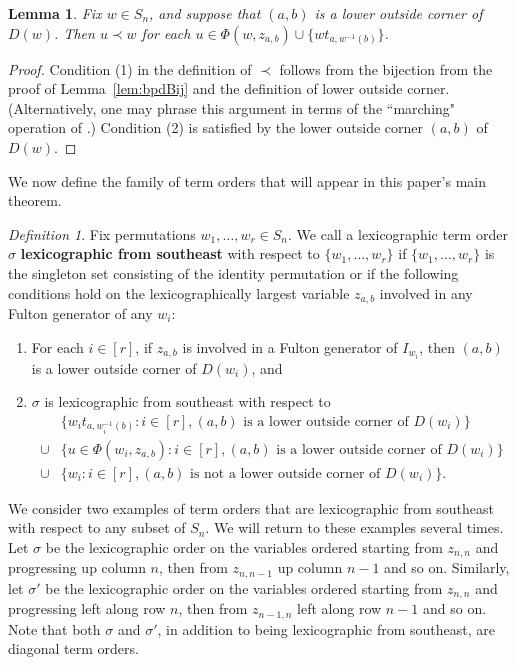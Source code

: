 \documentclass[12pt,reqno]{amsart}
\newtheorem{lemma}[theorem]{Lemma}
\newtheorem{Main Conjecture}[theorem]{Main Conjecture}
\theoremstyle{remark}
\newtheorem{defn}[theorem]{Definition}
\theoremstyle{plain}
\newcommand{\mydef}[1]{{\bf #1}}
\begin{document}
\begin{lemma}
\label{lem:indSmaller}
Fix $w \in S_n$, and suppose  that $(a,b)$ is a lower outside corner of $D(w)$. Then $u \prec w$ for each $u \in \Phi(w,z_{a,b}) \cup \{wt_{a,w^{-1}(b)}\}$.
\end{lemma}
\begin{proof}
Condition (1) in the definition of $\prec$ follows from the bijection from the proof of Lemma~\ref{lem:bpdBij} and the definition of lower outside corner. (Alternatively, one may phrase this argument in terms of the ``marching" operation of \cite{KY04}.) Condition (2) is satisfied by the lower outside corner $(a,b)$ of $D(w)$.\end{proof}




We now define the family of term orders that will appear in this paper's main theorem.  

\begin{defn}\label{def:lexFromSE}
Fix permutations $w_1, \ldots, w_r \in S_n$.  We call a lexicographic term order $\sigma$ \mydef{lexicographic from southeast} with respect to $\{w_1, \ldots, w_r\}$ if $\{w_1, \ldots, w_r\}$ is the singleton set consisting of the identity permutation or if the following conditions hold on the lexicographically largest variable $z_{a,b}$ involved in any Fulton generator of any $w_i$:
 \begin{enumerate}
    \item For each $i \in [r]$, if $z_{a,b}$ is involved in a Fulton generator of $I_{w_i}$, then $(a,b)$ is a lower outside corner of $D(w_i)$, and
    \item $\sigma$ is lexicographic from southeast with respect to \begin{align*}
   & \{w_i t_{a,w_i^{-1}(b)} : i \in [r], (a,b) \mbox{ is a lower outside corner of } D(w_i)\} \\
   \cup  &\{u \in \Phi(w_i,z_{a,b}) : i \in [r], (a,b) \mbox{ is a lower outside corner of } D(w_i)\} \\
   \cup &\{w_i : i \in [r], (a,b) \mbox{ is not a lower outside corner of } D(w_i)\}.
    \end{align*}
\end{enumerate}
\end{defn}

We consider two examples of term orders that are lexicographic from southeast with respect to any subset of $S_n$.  We will return to these examples several times. Let $\sigma$ be the lexicographic order on the variables ordered starting from $z_{n,n}$ and progressing up column $n$, then from $z_{n, n-1}$ up column $n-1$ and so on.  Similarly, let $\sigma'$ be the lexicographic order on the variables ordered starting from $z_{n,n}$ and progressing left along row $n$, then from $z_{n-1, n}$ left along row $n-1$ and so on.   Note that both $\sigma$ and $\sigma'$, in addition to being lexicographic from southeast, are diagonal term orders.
\end{document}
